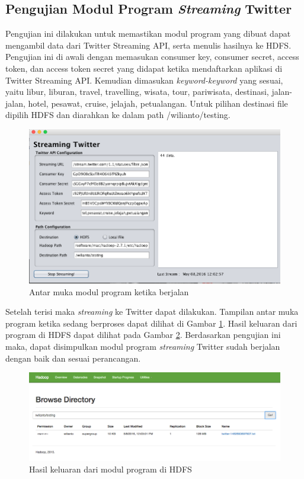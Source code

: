 \subsection{Pengujian Modul Program \textit{Streaming} Twitter}
Pengujian ini dilakukan untuk memastikan modul program yang dibuat dapat mengambil data dari Twitter Streaming API, serta menulis hasilnya ke HDFS. Pengujian ini di awali dengan memasukan consumer key, consumer secret, access token, dan access token secret yang didapat ketika mendaftarkan aplikasi di Twitter Streaming API. Kemudian dimasukan \textit{keyword-keyword} yang sesuai, yaitu libur, liburan, travel, travelling, wisata, tour, pariwisata, destinasi, jalan-jalan, hotel, pesawat, cruise, jelajah, petualangan. Untuk pilihan destinasi file dipilih HDFS dan diarahkan ke dalam path /wilianto/testing. 

\begin{figure}[H]
	\centering
	\includegraphics[scale=0.5]{Gambar/testing-twitter-01.png}
	\caption[Antar muka modul program ketika berjalan]{Antar muka modul program ketika berjalan} 
	\label{fig:testing_twitter_01}
\end{figure}

Setelah terisi maka \textit{streaming} ke Twitter dapat dilakukan. Tampilan antar muka program ketika sedang berproses dapat dilihat di Gambar \ref{fig:testing_twitter_01}. Hasil keluaran dari program di HDFS dapat dilihat pada Gambar \ref{fig:testing_twitter_02}. Berdasarkan pengujian ini maka, dapat disimpulkan modul program \textit{streaming} Twitter sudah berjalan dengan baik dan sesuai perancangan.

\begin{figure}[H]
	\centering
	\includegraphics[scale=0.4]{Gambar/testing-twitter-02.png}
	\caption[Hasil keluaran dari modul program di HDFS]{Hasil keluaran dari modul program di HDFS} 
	\label{fig:testing_twitter_02}
\end{figure}


